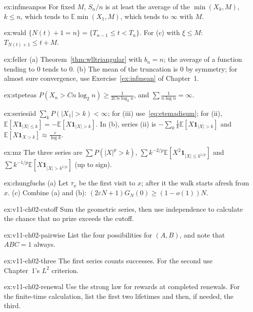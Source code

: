 \begin{hint}{ex:infmeanpos}
For fixed $M$, $S_n/n$ is at least the average of the $\min(X_k,M)$, $k\le n$, which tends to $\mathbb E\min(X_1,M)$, which tends to $\infty$ with $M$.
\end{hint}
\begin{hint}{ex:wald}
$\{N(t)+1=n\}=\{T_{n-1}\le t<T_n\}$. For (c) with $\xi\le M$: $T_{N(t)+1}\le t+M$.
\end{hint}
\begin{hint}{ex:feller}
(a) Theorem~\ref{thm:wlltriangular} with $b_n=n$; the average of a function tending to $0$ tends to $0$. (b) The mean of the truncation is $0$ by symmetry;
for almost sure convergence, use Exercise~\ref{ex:infmean} of Chapter~1.
\end{hint}
\begin{hint}{ex:stpeteas}
$P(X_n>Cn\log_2n)\ge\frac1{2Cn\log_2n}$, and $\sum\frac1{n\log n}=\infty$.
\end{hint}
\begin{hint}{ex:seriesiid}
$\sum_kP(|X_1|>k)<\infty$; for (iii) use~\eqref{eq:etemadisum}; for (ii), $\mathbb E[X\mathbf 1_{|X|\le k}]=-\mathbb E[X\mathbf 1_{|X|>k}]$. In (b), series (ii)
is $-\sum_k\frac1k\mathbb E[X\mathbf 1_{|X|>k}]$ and $\mathbb E[X\mathbf 1_{X>k}]\approx\frac e{\log k}$.
\end{hint}
\begin{hint}{ex:mz}
The three series are $\sum P(|X|^p>k)$, $\sum k^{-2/p}\mathbb E[X^2\mathbf 1_{|X|\le k^{1/p}}]$ and $\sum k^{-1/p}\mathbb E[X\mathbf 1_{|X|>k^{1/p}}]$ (up to sign).
\end{hint}
\begin{hint}{ex:chungfuchs}
(a) Let $\tau_x$ be the first visit to $x$; after it the walk starts afresh from $x$. (c) Combine (a) and (b): $(2\varepsilon N+1)G_N(0)\ge(1-o(1))N$.
\end{hint}


\begin{hint}{ex:v11-ch02-cutoff}
Sum the geometric series, then use independence to calculate the chance that no prize exceeds the cutoff.
\end{hint}
\begin{hint}{ex:v11-ch02-pairwise}
List the four possibilities for $(A,B)$, and note that $ABC=1$ always.
\end{hint}
\begin{hint}{ex:v11-ch02-three}
The first series counts successes. For the second use Chapter~1's $L^2$ criterion.
\end{hint}
\begin{hint}{ex:v11-ch02-renewal}
Use the strong law for rewards at completed renewals. For the finite-time calculation, list the first two lifetimes and then, if needed, the third.
\end{hint}

